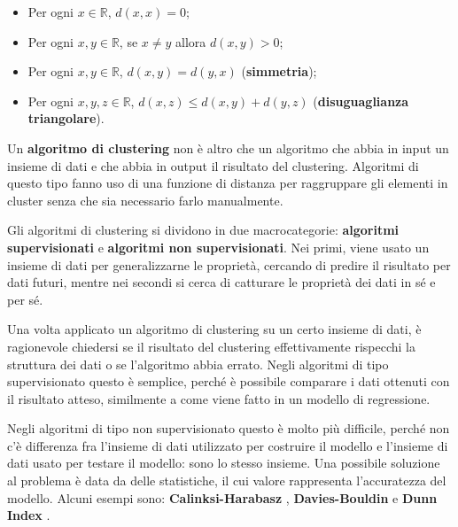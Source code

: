 \documentclass[a4paper, 12pt]{report}
\begin{document}
		\begin{itemize}
			\item
			Per ogni $x \in \mathbb{R}$, $d(x, x) = 0$;
			\item
			Per ogni $x, y \in \mathbb{R}$, se $x \neq y$ allora $d(x, y) > 0$;
			\item
			Per ogni $x, y \in \mathbb{R}$, $d(x, y) = d(y, x)$
			(\textbf{simmetria});
			\item
			Per ogni $x, y, z \in \mathbb{R}$, $d(x, z) \leq d(x, y) + d(y, z)$
			(\textbf{disuguaglianza triangolare}).
		\end{itemize}

		Un \textbf{algoritmo di clustering} non è altro che un algoritmo
		che abbia in input un insieme di dati e che abbia in output il
		risultato del clustering. Algoritmi di questo tipo fanno uso di
		una funzione di distanza per raggruppare gli elementi in cluster
		senza che sia necessario farlo manualmente.

		\begin{figure}[H]
			
			\label{Ipotetico esempio di clustering}
		\end{figure}

		Gli algoritmi di clustering si dividono in due macrocategorie:
		\textbf{algoritmi supervisionati} e \textbf{algoritmi non
		supervisionati}. Nei primi, viene usato un insieme di dati per
		generalizzarne le proprietà, cercando di predire il risultato
		per dati futuri, mentre nei secondi si cerca di catturare le
		proprietà dei dati in sé e per sé.

		Una volta applicato un algoritmo di clustering su un certo insieme
		di dati, è ragionevole chiedersi se il risultato del clustering
		effettivamente rispecchi la struttura dei dati o se l'algoritmo
		abbia errato. Negli algoritmi di tipo supervisionato questo è
		semplice, perché è possibile comparare i dati ottenuti con il
		risultato atteso, similmente a come viene fatto in un modello di
		regressione.

		Negli algoritmi di tipo non supervisionato questo è molto
		più difficile, perché non c'è differenza fra l'insieme di
		dati utilizzato per costruire il modello e l'insieme di
		dati usato per testare il modello: sono lo stesso insieme.
		Una possibile soluzione al problema è data da delle statistiche,
		il cui valore rappresenta l'accuratezza del modello. Alcuni
		esempi sono: \textbf{Calinksi-Harabasz} \cite{Calinski01011974},
		\textbf{Davies-Bouldin} \cite{4766909} e \textbf{Dunn Index}
		\cite{Dunn01011974}.
\end{document}
